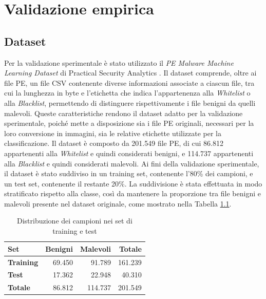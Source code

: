 \chapter{Validazione empirica}

\section{Dataset}

Per la validazione sperimentale è stato utilizzato il
\textit{PE Malware Machine Learning Dataset} di Practical Security
Analytics \cite{lester2021}. Il dataset comprende, oltre ai file PE,
un file CSV contenente diverse informazioni associate a ciascun
file, tra cui la lunghezza in byte e l'etichetta che indica
l'appartenenza alla \textit{Whitelist} o alla \textit{Blacklist},
permettendo di distinguere rispettivamente i file benigni da quelli
malevoli. Queste caratteristiche rendono il dataset
adatto per la validazione sperimentale, poiché mette a disposizione sia i file PE
originali, necessari per la loro conversione in immagini, sia le
relative etichette utilizzate per la classificazione.
Il dataset è composto da 201.549 file PE, di cui
86.812 appartenenti alla \textit{Whitelist} e quindi considerati
benigni, e 114.737 appartenenti alla \textit{Blacklist} e quindi
considerati malevoli.
Ai fini della validazione sperimentale, il dataset è stato suddiviso
in un training set, contenente l'80\% dei campioni, e un test set,
contenente il restante 20\%. La suddivisione è stata effettuata in
modo stratificato rispetto alla classe, così da mantenere la
proporzione tra file benigni e malevoli presente nel dataset
originale, come mostrato nella Tabella \ref{tab:dataset_split}.

\begin{table}[H]
    \centering
    \caption{Distribuzione dei campioni nei set di training e test}
    \label{tab:dataset_split}
    \renewcommand{\arraystretch}{1.3}
    \begin{tabular}{lrrr}
        \toprule
        \textbf{Set} & \textbf{Benigni} & \textbf{Malevoli} & \textbf{Totale} \\
        \midrule
        \textbf{Training} & 69.450 & 91.789 & 161.239 \\
        \textbf{Test}     & 17.362 & 22.948 & 40.310 \\
        \midrule
        \textbf{Totale}   & 86.812 & 114.737 & 201.549 \\
        \bottomrule
    \end{tabular}
\end{table}

